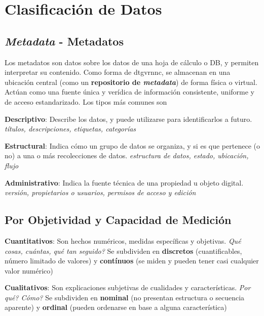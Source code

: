 \section{Clasificación de Datos}

\subsection{\textit{Metadata} - Metadatos}
Los metadatos son datos sobre los datos de una hoja de cálculo o DB, y permiten interpretar su contenido. Como forma de \gls{dtgvrnnc}, se almacenan en una ubicación central (como un \textbf{repositorio de \textit{metadata}}) de forma física o virtual. Actúan como una fuente única y verídica de información consistente, uniforme y de acceso estandarizado. Los tipos más comunes son
\begin{description}
        \item {\textbf{Descriptivo}: Describe los datos, y puede utilizarse para identificarlos a futuro. \textit{títulos, descripciones, etiquetas, categorías}}
        \item {\textbf{Estructural}: Indica cómo un grupo de datos se organiza, y si es que pertenece (o no) a una o más recolecciones de datos. \textit{estructura de datos, estado, ubicación, flujo}}
        \item {\textbf{Administrativo}: Indica la fuente técnica de una propiedad u objeto digital. \textit{versión, propietarios o usuarios, permisos de acceso y edición}}
\end{description}

\subsection{Por Objetividad y Capacidad de Medición}
\begin{description}
    \item{\textbf{Cuantitativos}: Son hechos numéricos, medidas específicas y objetivas. \textit{Qué cosas, cuántas, qué tan seguido?} Se subdividen en \textbf{discretos} (cuantificables, número limitado de valores) y \textbf{contínuos} (se miden y pueden tener casi cualquier valor numérico)}
    \item{\textbf{Cualitativos}: Son explicaciones subjetivas de cualidades y características. \textit{Por qué? Cómo?} Se subdividen en \textbf{nominal} (no presentan estructura o secuencia aparente) y \textbf{ordinal} (pueden ordenarse en base a alguna característica)}
\end{description}

